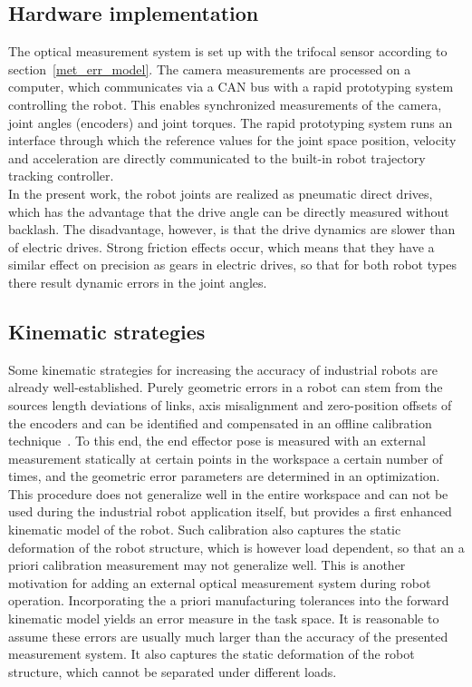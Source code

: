 \documentclass[5p,times,procedia]{elsarticle}
\begin{document}
\subsection{Hardware implementation}
The optical measurement system is set up with the trifocal sensor according to section~\ref{met_err_model}.
The camera measurements are processed on a computer, which communicates via a CAN bus with a rapid prototyping system controlling the robot.
This enables synchronized measurements of the camera, joint angles (encoders) and joint torques.
The rapid prototyping system runs an interface through which the reference values for the joint space position, velocity and acceleration are directly communicated to the built-in robot trajectory tracking controller.\\
In the present work, the robot joints are realized as pneumatic direct drives, which has the advantage that the drive angle can be directly measured without backlash. 
The disadvantage, however, is that the drive dynamics are slower than of electric drives. Strong friction effects occur, which means that they have a similar effect on precision as gears in electric drives, so that for both robot types there result dynamic errors in the joint angles. 


\subsection{Kinematic strategies}
Some kinematic strategies for increasing the accuracy of industrial robots are already well-established.
Purely geometric errors in a robot can stem from the sources length deviations of links, axis misalignment and zero-position offsets of the encoders and can be identified and compensated in an offline calibration technique~\cite{Wiest01}.
To this end, the end effector pose is measured with an external measurement statically at certain points in the workspace a certain number of times, and the geometric error parameters are determined in an optimization.
This procedure does not generalize well in the entire workspace and can not be used during the industrial robot application itself, but provides a first enhanced kinematic model of the robot.
Such calibration also captures the static deformation of the robot structure, which is however load dependent, so that an a priori calibration measurement may not generalize well. This is another motivation for adding an external optical measurement system during robot operation.
Incorporating the a priori manufacturing tolerances into the forward kinematic model yields an error measure in the task space.
It is reasonable to assume these errors are usually much larger than the accuracy of the presented measurement system. It also captures the static deformation of the robot structure, which cannot be separated under different loads.
%
\end{document}
